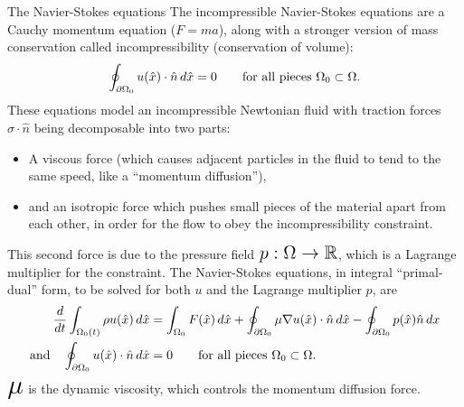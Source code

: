 \documentclass{article}
\begin{document}
\newpage
\vskip 0.2in
{\large The Navier-Stokes equations}
\vskip 0.2in
\noindent
The incompressible Navier-Stokes equations are a Cauchy momentum equation ($F = ma$),
along with a stronger version of mass conservation called incompressibility (conservation of volume):
    $$\oint_{\partial\Omega_0}u(\hat{x})\cdot\hat{n}\,d\hat{x} = 0 \text{\quad\quad for all pieces $\Omega_0 \subset \Omega$}.$$
These equations model an incompressible Newtonian fluid
with traction forces $\sigma\cdot\hat{n}$ being decomposable into two parts:
\begin{itemize}
    \item A viscous force (which causes adjacent particles
in the fluid to tend to the same speed, like a ``momentum diffusion''),
    \item and an isotropic force which pushes
    small pieces of the material apart from each other, in order for the flow to obey the incompressibility constraint.
\end{itemize}
This second force is due to the pressure field
$\text{\Large $p : \Omega \rightarrow \mathbb{R}$}$,
which is a Lagrange multiplier
for the constraint. The Navier-Stokes equations, in integral ``primal-dual'' form, to be solved for both
$u$ and the Lagrange multiplier $p$, are
\begin{equation}\label{navier_stokes}
\begin{split}
    \frac{d}{dt} \int_{\Omega_0(t)} \rho u(\hat{x}) \,d\hat{x} &=
        \int_{\Omega_0}F(\hat{x})\,d\hat{x} + \oint_{\partial \Omega_0} \mu\nabla u(\hat{x})\cdot \hat{n}\,d\hat{x}
            -\oint_{\partial\Omega_0} p(\hat{x})\hat{n}\,dx\\
    \text{and\quad} \oint_{\partial\Omega_0}u(\hat{x})\cdot\hat{n}\,d\hat{x} &= 0 \text{\quad\quad for all pieces $\Omega_0 \subset \Omega$}.
\end{split}
\end{equation}
$\text{\huge $\mu$}$ is the dynamic viscosity, which controls the momentum diffusion force.
\end{document}
